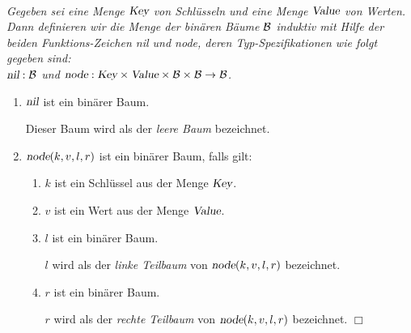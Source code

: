\begin{Definition} \hspace*{\fill} \\
{\em
  Gegeben sei eine Menge $\textsl{Key}$ von Schl\"usseln und eine Menge $\textsl{Value}$ von
  Werten.  Dann definieren wir
  die Menge der bin\"aren B\"aume $\mathcal{B}$ induktiv mit Hilfe der
  beiden Funktions-Zeichen \textsl{nil} und \textsl{node}, deren Typ-Spezifikationen 
  wie folgt gegeben sind: \\[0.1cm]
  \hspace*{1.3cm} 
  $\textsl{nil}: \mathcal{B}$ \qquad und \qquad  $\textsl{node}: \textsl{Key} \times \textsl{Value} \times \mathcal{B} \times \mathcal{B} \rightarrow \mathcal{B}$.
  \begin{enumerate}
  \item $\textsl{nil}$ ist ein bin\"arer Baum.

        Dieser Baum wird als der \emph{leere Baum} bezeichnet.
  \item $\textsl{node}(k, v, l, r)$ ist ein bin\"arer Baum, falls gilt: 
        \begin{enumerate}
        \item $k$ ist ein Schl\"ussel aus der Menge $\textsl{Key}$.
        \item $v$ ist ein Wert aus der Menge $\textsl{Value}$.
        \item $l$ ist ein bin\"arer Baum.

              $l$ wird als der \emph{linke Teilbaum} von $\textsl{node}(k, v, l, r)$ bezeichnet.
        \item $r$ ist ein bin\"arer Baum.

              $r$ wird als der \emph{rechte Teilbaum} von $\textsl{node}(k, v, l, r)$ bezeichnet.
              \hspace*{\fill} $\Box$
        \end{enumerate}
  \end{enumerate}
}
\end{Definition}

